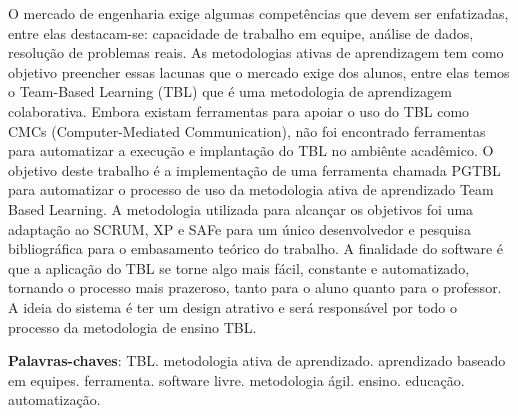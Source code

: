 \begin{resumo}
O mercado de engenharia exige algumas competências que devem ser enfatizadas, entre elas destacam-se: capacidade de trabalho em equipe, análise de dados, resolução de problemas reais. As metodologias ativas de aprendizagem tem como objetivo preencher essas lacunas que o mercado exige dos alunos, entre elas temos o Team-Based Learning (TBL) que é uma metodologia de aprendizagem colaborativa. Embora existam ferramentas para apoiar o uso do TBL como CMCs (Computer-Mediated Communication), não foi encontrado ferramentas para automatizar a execução e implantação do TBL no ambiênte acadêmico. O objetivo deste trabalho é a implementação de uma ferramenta chamada PGTBL para automatizar o processo de uso da metodologia ativa de aprendizado Team Based Learning. A metodologia utilizada para alcançar os objetivos foi uma adaptação ao SCRUM, XP e SAFe para um único desenvolvedor e pesquisa bibliográfica para o embasamento teórico do trabalho. A finalidade do software é que a aplicação do TBL se torne algo mais fácil, constante e automatizado, tornando o processo mais prazeroso, tanto para o aluno quanto para o professor. A ideia do sistema é ter um design atrativo e será responsável por todo o processo da metodologia de ensino TBL.

 \vspace{\onelineskip}

 \noindent
 \textbf{Palavras-chaves}: TBL. metodologia ativa de aprendizado. aprendizado baseado em equipes. ferramenta. software
  livre. metodologia ágil. ensino. educação. automatização.
\end{resumo}
